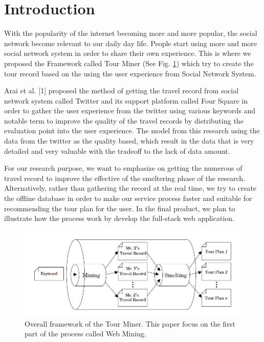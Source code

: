 \documentclass[conference]{IEEEtran}
\begin{document}
\section{Introduction}
With the popularity of the internet becoming more and more popular, the social network become relevant to our daily day life. People start using more and more social network system in order to share their own experience. This is where we proposed the Framework called Tour Miner (See  Fig. \ref{fig:overall}) which try to create the tour record based on the using the user experience from Social Network System. \par
Arai et al. [1] proposed the method of getting the travel record from social network system called Twitter and its support platform called Four Square in order to gather the user experience from the twitter using various keywords and notable term to improve the quality of the travel records by distributing the evaluation point into the user experience. The model from this research using the data from the twitter as the quality based, which result in the data that is very detailed and very valuable with the tradeoff to the lack of data amount. \par
For our research purpose, we want to emphasize on getting the numerous of travel record to improve the effective of the smeltering phase of the research. Alternatively, rather than gathering the record at the real time, we try to create the offline database in order to make our service process faster and suitable for recommending the tour plan for the user. In the final product, we plan to illustrate how the process work by develop the full-stack web application.

 \begin{figure}
  \includegraphics[width=\linewidth]{overall.png}
  \caption{Overall framework of the Tour Miner. This paper focus on the first part of the process called Web Mining.}
  \label{fig:overall}
\end{figure}
\end{document}
